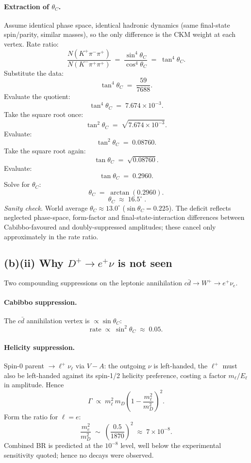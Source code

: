 \documentclass[11pt]{article}
\begin{document}
\paragraph{Extraction of $\theta_{C}$.} Assume identical phase space, identical hadronic dynamics (same final-state spin/parity, similar masses), so the only difference is the CKM weight at each vertex. Rate ratio:
\begin{equation}
\frac{N(K^{+}\pi^{-}\pi^{+})}{N(K^{-}\pi^{+}\pi^{+})}\;=\;\frac{\sin^{4}\theta_{C}}{\cos^{4}\theta_{C}}\;=\;\tan^{4}\theta_{C}.
\label{eq:ratio-DCS}
\end{equation}
Substitute the data:
\[
\tan^{4}\theta_{C}\;=\;\frac{59}{7688}.
\]
Evaluate the quotient:
\[
\tan^{4}\theta_{C}\;=\;7.674\times 10^{-3}.
\]
Take the square root once:
\[
\tan^{2}\theta_{C}\;=\;\sqrt{7.674\times 10^{-3}}.
\]
Evaluate:
\[
\tan^{2}\theta_{C}\;=\;0.08760.
\]
Take the square root again:
\[
\tan\theta_{C}\;=\;\sqrt{0.08760}.
\]
Evaluate:
\[
\tan\theta_{C}\;=\;0.2960.
\]
Solve for $\theta_{C}$:
\[
\theta_{C}\;=\;\arctan(0.2960).
\]
\begin{equation}
\boxed{\;\theta_{C}\;\approx\;16.5^{\circ}\;.}
\label{eq:thetaC}
\end{equation}
\emph{Sanity check.} World average $\theta_{C}\approx 13.0^{\circ}$ ($\sin\theta_{C}=0.225$). The deficit reflects neglected phase-space, form-factor and final-state-interaction differences between Cabibbo-favoured and doubly-suppressed amplitudes; these cancel only approximately in the rate ratio.

\subsection*{(b)(ii) Why $D^{+}\to e^{+}\nu$ is not seen}

Two compounding suppressions on the leptonic annihilation $c\bar d\to W^{+}\to e^{+}\nu_{e}$.
\paragraph{Cabibbo suppression.} The $c\bar d$ annihilation vertex is $\propto\sin\theta_{C}$:
\[
\text{rate}\;\propto\;\sin^{2}\theta_{C}\;\approx\;0.05.
\]
\paragraph{Helicity suppression.} Spin-0 parent $\to\ell^{+}\nu_{\ell}$ via $V\!-\!A$: the outgoing $\nu$ is left-handed, the $\ell^{+}$ must also be left-handed against its spin-1/2 helicity preference, costing a factor $m_{\ell}/E_{\ell}$ in amplitude. Hence
\[
\Gamma\;\propto\;m_{\ell}^{2}\,m_{D}\!\left(1-\frac{m_{\ell}^{2}}{m_{D}^{2}}\right)^{2}.
\]
Form the ratio for $\ell=e$:
\[
\frac{m_{e}^{2}}{m_{D}^{2}}\;\sim\;\left(\frac{0.5}{1870}\right)^{2}\;\approx\;7\times 10^{-8}.
\]
Combined BR is predicted at the $10^{-8}$ level, well below the experimental sensitivity quoted; hence no decays were observed.
\end{document}
